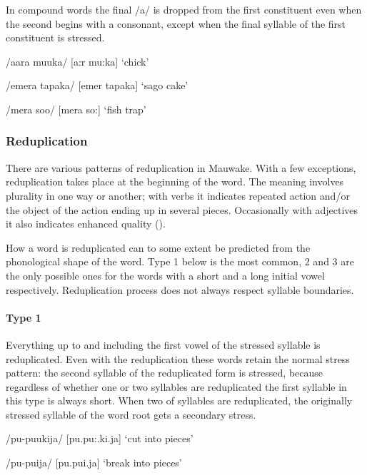 In compound words the final /a/ is dropped from the first constituent even when the second begins with a consonant, except when the final syllable of the first constituent is stressed.  

/aara muuka/  [{{\textprimstress}a:r {{\textprimstress}}mu:ka}]  `chick'

/emera tapaka/  [e{{\textprimstress}mer ta{{\textprimstress}}paka}]  `sago cake'

/mera soo/  [me{{\textprimstress}ra {{\textprimstress}}so:}]  `fish trap'

\subsubsection[Reduplication]{Reduplication}

There are various patterns of reduplication in Mauwake. With a few exceptions, reduplication takes place at the beginning of the word.  The meaning involves plurality in one way or another; with verbs it indicates repeated action and/or the object of the action ending up in several pieces. Occasionally with adjectives it also indicates enhanced quality ().

How a word is reduplicated can to some extent be predicted from the phonological shape of the word.  Type 1 below is the most common, 2 and 3 are the only possible ones for the words with a short and a long initial vowel respectively.  Reduplication process does not always respect syllable boundaries.

\paragraph[Type 1]{Type 1}

Everything up to and including the first vowel of the stressed syllable is reduplicated.  Even with the reduplication these words retain the normal stress pattern: the second syllable of the reduplicated form is stressed, because regardless of whether one or two syllables are reduplicated the first syllable in this type is always short. When two of syllables are reduplicated, the originally stressed syllable of the word root gets a secondary stress.

/pu-puukija/  [pu.{{\textprimstress}pu:.ki.ja}]  `cut into pieces'

/pu-puija/  [pu.{{\textprimstress}pui.ja}]  `break into pieces'

